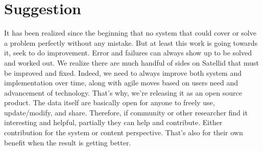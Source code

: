 \section{Suggestion}
\label{sec:suggestion}

It has been realized since the beginning that no system that could cover or solve a problem perfectly without any mistake.
But at least this work is going towards it, seek to do improvement.
Error and failures can always show up to be solved and worked out.
We realize there are much handful of sides on Satellid that must be improved and fixed.
Indeed, we need to always improve both system and implementation over time, along with agile moves based on users need and advancement of technology.
That's why, we're releasing it as an open source product.
The data itself are basically open for anyone to freely use, update/modify, and share.
Therefore, if community or other researcher find it interesting and helpful, partially they can help and contribute.
Either contribution for the system or content perspective.
That's also for their own benefit when the result is getting better.
